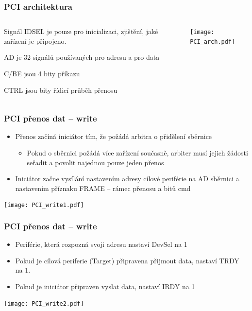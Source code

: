 \documentclass{beamer}
\begin{document}
\begin{frame}
\frametitle{PCI architektura}

\begin{columns}
\begin{column}{0.35\textwidth}
Signál IDSEL je pouze pro inicializaci, zjištění, jaké zařízení je připojeno.

\bigskip
AD je 32 signálů používaných pro adresu a pro data

\bigskip
C/BE jsou 4 bity příkazu

\bigskip
CTRL jsou bity řídicí průběh přenosu
\end{column}
\begin{column}{0.6\textwidth}  
\texttt{[image: PCI\_arch.pdf]}
\end{column}
\end{columns}

\end{frame}


\begin{frame}
\frametitle{PCI přenos dat -- write}

\begin{itemize}
\item Přenos začíná iniciátor tím, že požádá arbitra o přidělení sběrnice
\begin{itemize}
\item Pokud o sběrnici požádá více zařízení současně, arbiter musí jejich žádosti seřadit a povolit najednou pouze jeden přenos
\end{itemize}
\item Iniciátor začne vysílání nastavením adresy cílové periférie na AD sběrnici a nastavením příznaku FRAME -- rámec přenosu a bitů cmd
\end{itemize}

\texttt{[image: PCI\_write1.pdf]}

\end{frame}

\begin{frame}
\frametitle{PCI přenos dat -- write}

\begin{itemize}
\item Periférie, která rozpozná svoji adresu nastaví DevSel na 1
\item Pokud je cílová periferie (Target) připravena přijmout data, nastaví TRDY na 1. 
\item Pokud je iniciátor připraven vyslat data, nastaví IRDY na 1
\end{itemize}

\texttt{[image: PCI\_write2.pdf]}

\end{frame}
\end{document}
